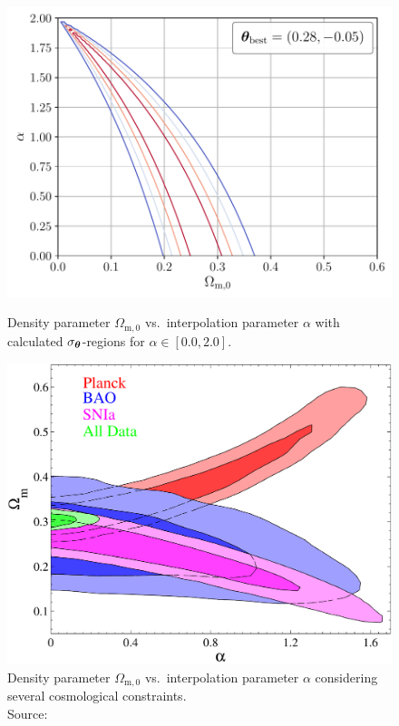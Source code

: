 \begin{figure}
    \begin{minipage}{8cm}
        \centering
        \includegraphics[scale=0.53]{figures/plots/PDF/DGP-analytic-chi2_Omega-m0-vs-alpha-0-2.pdf}
        \caption{Density parameter $\Omega_{\text{m},0}$ vs.\ interpolation parameter $\alpha$ with calculated $\sigma_{\vb*{\theta}}$-regions for $\alpha \in [0.0, 2.0]$.}
        \label{fig:DGP-analytic-chi2_Omega-m0-vs-alpha-0-2}
    \end{minipage}
    \hspace*{1cm}
    \begin{minipage}{8cm}
        \centering
        \includegraphics[scale=0.55]{figures/plots/PNG/testing-DGP-with-planck.png}
        \caption{Density parameter $\Omega_{\text{m},0}$ vs.\ interpolation parameter $\alpha$ considering several cosmological constraints. \\
        Source: \cite[Figure 3]{Li2013}}
        \label{fig:testing-DGP-with-planck} 
    \end{minipage}
\end{figure}


